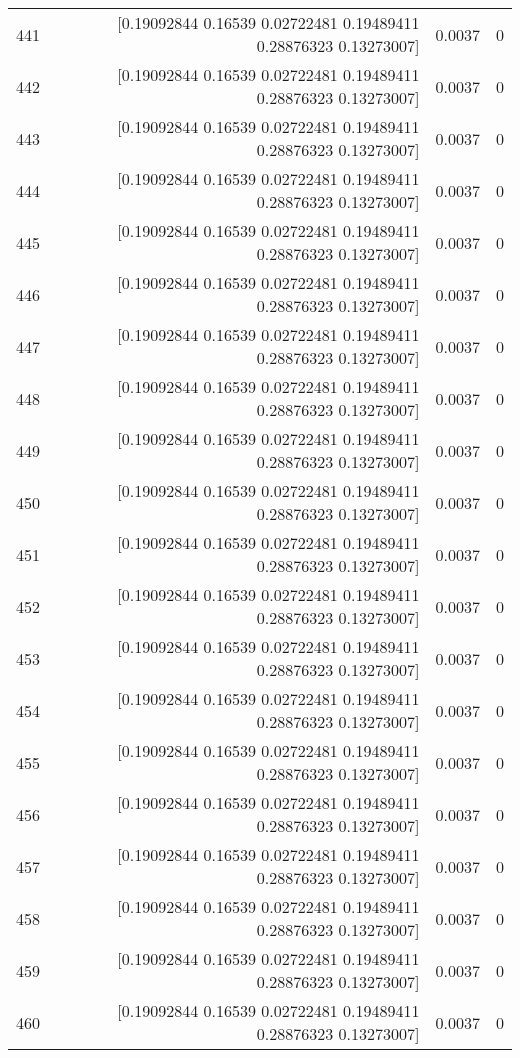 \begin{longtable}{lrrr}
441 & [0.19092844 0.16539    0.02722481 0.19489411 0.28876323 0.13273007] & 0.0037 & 0 \\
442 & [0.19092844 0.16539    0.02722481 0.19489411 0.28876323 0.13273007] & 0.0037 & 0 \\
443 & [0.19092844 0.16539    0.02722481 0.19489411 0.28876323 0.13273007] & 0.0037 & 0 \\
444 & [0.19092844 0.16539    0.02722481 0.19489411 0.28876323 0.13273007] & 0.0037 & 0 \\
445 & [0.19092844 0.16539    0.02722481 0.19489411 0.28876323 0.13273007] & 0.0037 & 0 \\
446 & [0.19092844 0.16539    0.02722481 0.19489411 0.28876323 0.13273007] & 0.0037 & 0 \\
447 & [0.19092844 0.16539    0.02722481 0.19489411 0.28876323 0.13273007] & 0.0037 & 0 \\
448 & [0.19092844 0.16539    0.02722481 0.19489411 0.28876323 0.13273007] & 0.0037 & 0 \\
449 & [0.19092844 0.16539    0.02722481 0.19489411 0.28876323 0.13273007] & 0.0037 & 0 \\
450 & [0.19092844 0.16539    0.02722481 0.19489411 0.28876323 0.13273007] & 0.0037 & 0 \\
451 & [0.19092844 0.16539    0.02722481 0.19489411 0.28876323 0.13273007] & 0.0037 & 0 \\
452 & [0.19092844 0.16539    0.02722481 0.19489411 0.28876323 0.13273007] & 0.0037 & 0 \\
453 & [0.19092844 0.16539    0.02722481 0.19489411 0.28876323 0.13273007] & 0.0037 & 0 \\
454 & [0.19092844 0.16539    0.02722481 0.19489411 0.28876323 0.13273007] & 0.0037 & 0 \\
455 & [0.19092844 0.16539    0.02722481 0.19489411 0.28876323 0.13273007] & 0.0037 & 0 \\
456 & [0.19092844 0.16539    0.02722481 0.19489411 0.28876323 0.13273007] & 0.0037 & 0 \\
457 & [0.19092844 0.16539    0.02722481 0.19489411 0.28876323 0.13273007] & 0.0037 & 0 \\
458 & [0.19092844 0.16539    0.02722481 0.19489411 0.28876323 0.13273007] & 0.0037 & 0 \\
459 & [0.19092844 0.16539    0.02722481 0.19489411 0.28876323 0.13273007] & 0.0037 & 0 \\
460 & [0.19092844 0.16539    0.02722481 0.19489411 0.28876323 0.13273007] & 0.0037 & 0 \\

\end{longtable}
